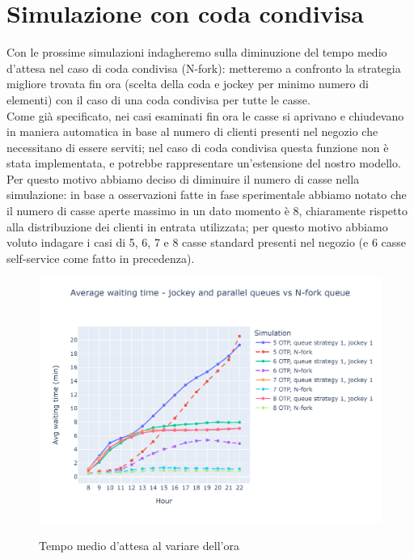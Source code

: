 \section{Simulazione con coda condivisa}

Con le prossime simulazioni indagheremo sulla diminuzione del tempo medio d'attesa nel caso di coda condivisa (N-fork): metteremo a confronto la strategia migliore trovata fin ora (scelta della coda e jockey per minimo numero di elementi) con il caso di una coda condivisa per tutte le casse. \\
Come già specificato, nei casi esaminati fin ora le casse si aprivano e chiudevano in maniera automatica in base al numero di clienti presenti nel negozio che necessitano di essere serviti; nel caso di coda condivisa questa funzione non è stata implementata, e potrebbe rappresentare un'estensione del nostro modello. Per questo motivo abbiamo deciso di diminuire il numero di casse nella simulazione: in base a osservazioni fatte in fase sperimentale abbiamo notato che il numero di casse aperte massimo in un dato momento è 8, chiaramente rispetto alla distribuzione dei clienti in entrata utilizzata; per questo motivo abbiamo voluto indagare i casi di 5, 6, 7 e 8 casse standard presenti nel negozio (e 6 casse self-service come fatto in precedenza).

\begin{figure}[H]
	\centering
	\includegraphics[width=12cm]{"images/results/avg_wt_codacondivisa.png"}
	\label{fig:avg_wt_codacondivisa}
	\caption{Tempo medio d'attesa al variare dell'ora}
\end{figure}

